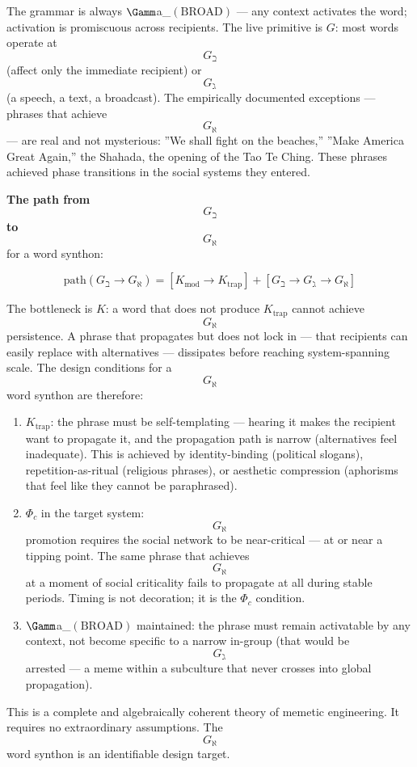 \documentclass[12pt,a4paper]{article}
\begin{document}
The grammar is always $\Gamm$a_{\vee}$(\text{BROAD})$ --- any context activates the word; activation is promiscuous across recipients. The live primitive is $G$: most words operate at $$G_{\beth}$$ (affect only the immediate recipient) or $$G_{\gimel}$$ (a speech, a text, a broadcast). The empirically documented exceptions --- phrases that achieve $$G_{\aleph}$$ --- are real and not mysterious: ''We shall fight on the beaches,'' ''Make America Great Again,'' the Shahada, the opening of the Tao Te Ching. These phrases achieved phase transitions in the social systems they entered.

\textbf{The path from $$G_{\beth}$$ to $$G_{\aleph}$$} for a word synthon:

\[\text{path}(G_\beth \to G_\aleph) = [K_\text{mod} \to K_\text{trap}] + [G_\beth \to G_\gimel \to G_\aleph]\]

The bottleneck is $K$: a word that does not produce $K_\text{trap}$ cannot achieve $$G_{\aleph}$$ persistence. A phrase that propagates but does not lock in --- that recipients can easily replace with alternatives --- dissipates before reaching system-spanning scale. The design conditions for a $$G_{\aleph}$$ word synthon are therefore:

\begin{enumerate}
    \item $K_\text{trap}$: the phrase must be self-templating --- hearing it makes the recipient want to propagate it, and the propagation path is narrow (alternatives feel inadequate). This is achieved by identity-binding (political slogans), repetition-as-ritual (religious phrases), or aesthetic compression (aphorisms that feel like they cannot be paraphrased).
    \item $\Phi_c$ in the target system: $$G_{\aleph}$$ promotion requires the social network to be near-critical --- at or near a tipping point. The same phrase that achieves $$G_{\aleph}$$ at a moment of social criticality fails to propagate at all during stable periods. Timing is not decoration; it is the $\Phi_c$ condition.
    \item $\Gamm$a_{\vee}$(\text{BROAD})$ maintained: the phrase must remain activatable by any context, not become specific to a narrow in-group (that would be $$G_{\gimel}$$ arrested --- a meme within a subculture that never crosses into global propagation).
\end{enumerate}

This is a complete and algebraically coherent theory of memetic engineering. It requires no extraordinary assumptions. The $$G_{\aleph}$$ word synthon is an identifiable design target.
\end{document}
